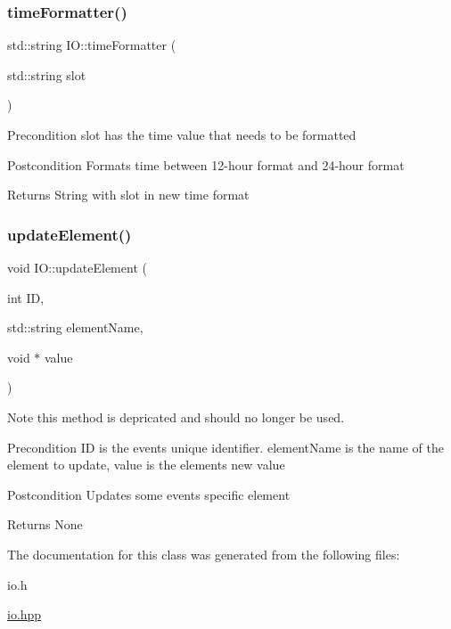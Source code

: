 \subsubsection{\texorpdfstring{time\+Formatter()}{timeFormatter()}}
{\footnotesize\ttfamily std\+::string I\+O\+::time\+Formatter (\begin{DoxyParamCaption}\item[{std\+::string}]{slot }\end{DoxyParamCaption})\hspace{0.3cm}{\ttfamily [static]}}

\begin{DoxyPrecond}{Precondition}
slot has the time value that needs to be formatted 
\end{DoxyPrecond}
\begin{DoxyPostcond}{Postcondition}
Formats time between 12-\/hour format and 24-\/hour format 
\end{DoxyPostcond}
\begin{DoxyReturn}{Returns}
String with slot in new time format 
\end{DoxyReturn}
\mbox{\label{classIO_a11fdb7d4afa830fa1441fbf566f73432}} 
\subsubsection{\texorpdfstring{update\+Element()}{updateElement()}}
{\footnotesize\ttfamily void I\+O\+::update\+Element (\begin{DoxyParamCaption}\item[{int}]{ID,  }\item[{std\+::string}]{element\+Name,  }\item[{void $\ast$}]{value }\end{DoxyParamCaption})}

\begin{DoxyNote}{Note}
this method is depricated and should no longer be used. 
\end{DoxyNote}
\begin{DoxyPrecond}{Precondition}
ID is the event\textquotesingle{}s unique identifier. element\+Name is the name of the element to update, value is the element\textquotesingle{}s new value 
\end{DoxyPrecond}
\begin{DoxyPostcond}{Postcondition}
Updates some event\textquotesingle{}s specific element 
\end{DoxyPostcond}
\begin{DoxyReturn}{Returns}
None 
\end{DoxyReturn}


The documentation for this class was generated from the following files\+:\begin{DoxyCompactItemize}
\item 
io.\+h\item 
\hyperlink{io_8hpp}{io.\+hpp}\end{DoxyCompactItemize}
